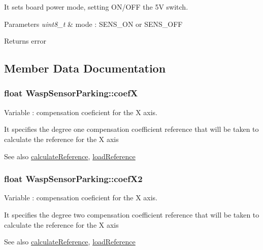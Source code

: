 It sets board power mode, setting O\+N/\+O\+FF the 5V switch. 


\begin{DoxyParams}{Parameters}
{\em uint8\+\_\+t} & mode \+: S\+E\+N\+S\+\_\+\+ON or S\+E\+N\+S\+\_\+\+O\+FF \\
\hline
\end{DoxyParams}
\begin{DoxyReturn}{Returns}
error 
\end{DoxyReturn}


\subsection{Member Data Documentation}
\subsubsection[{\texorpdfstring{coefX}{coefX}}]{\setlength{\rightskip}{0pt plus 5cm}float Wasp\+Sensor\+Parking\+::coefX}\hypertarget{class_wasp_sensor_parking_ac994717599ea6fc41329bf640d3ac944}{}\label{class_wasp_sensor_parking_ac994717599ea6fc41329bf640d3ac944}


Variable \+: compensation coeficient for the X axis. 

It specifies the degree one compensation coefficient reference that will be taken to calculate the reference for the X axis \begin{DoxySeeAlso}{See also}
\hyperlink{class_wasp_sensor_parking_a8fe1255a714fed88684a89363963eb02}{calculate\+Reference}, \hyperlink{class_wasp_sensor_parking_ada85f8d26b42a4a6733c0e1d1880a4ad}{load\+Reference} 
\end{DoxySeeAlso}
\subsubsection[{\texorpdfstring{coef\+X2}{coefX2}}]{\setlength{\rightskip}{0pt plus 5cm}float Wasp\+Sensor\+Parking\+::coef\+X2}\hypertarget{class_wasp_sensor_parking_a94b63101ce4110a3823c705d8ecf549d}{}\label{class_wasp_sensor_parking_a94b63101ce4110a3823c705d8ecf549d}


Variable \+: compensation coeficient for the X axis. 

It specifies the degree two compensation coefficient reference that will be taken to calculate the reference for the X axis \begin{DoxySeeAlso}{See also}
\hyperlink{class_wasp_sensor_parking_a8fe1255a714fed88684a89363963eb02}{calculate\+Reference}, \hyperlink{class_wasp_sensor_parking_ada85f8d26b42a4a6733c0e1d1880a4ad}{load\+Reference} 
\end{DoxySeeAlso}
